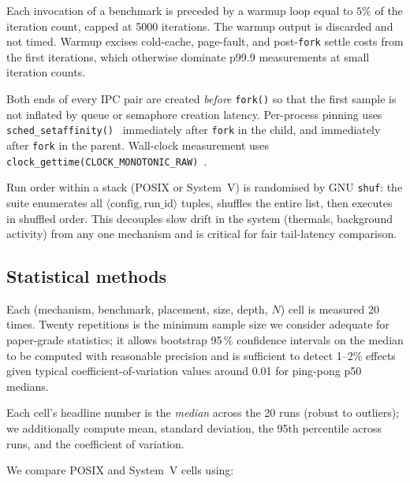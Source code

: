 \documentclass[a4paper,11pt]{article}
\begin{document}
Each invocation of a benchmark is preceded by a warmup loop equal to
$5\%$ of the iteration count, capped at 5000 iterations. The warmup
output is discarded and not timed. Warmup excises cold-cache, page-fault,
and post-\texttt{fork} settle costs from the first iterations, which
otherwise dominate p99.9 measurements at small iteration counts.

Both ends of every IPC pair are created \emph{before}
\texttt{fork()} so that the first sample is not inflated by queue or
semaphore creation latency. Per-process pinning uses
\texttt{sched\_setaffinity()}~\cite{linux_setaffinity} immediately after
\texttt{fork} in the child, and immediately after \texttt{fork} in the
parent. Wall-clock measurement uses \texttt{clock\_gettime(CLOCK\_MONOTONIC\_RAW)}~\cite{linux_clock}.

Run order within a stack (POSIX or System~V) is randomised by GNU
\texttt{shuf}: the suite enumerates all
$\langle\text{config},\text{run\_id}\rangle$ tuples, shuffles the entire
list, then executes in shuffled order. This decouples slow drift in the
system (thermals, background activity) from any one mechanism and is
critical for fair tail-latency comparison.

\subsection{Statistical methods}
\label{sec:method:stats}

Each (mechanism, benchmark, placement, size, depth, $N$) cell is measured
20 times. Twenty repetitions is the minimum sample size we consider
adequate for paper-grade statistics; it allows bootstrap 95\,\% confidence
intervals on the median to be computed with reasonable precision and is
sufficient to detect 1--2\% effects given typical coefficient-of-variation
values around 0.01 for ping-pong p50 medians.

Each cell's headline number is the \emph{median} across the 20 runs
(robust to outliers); we additionally compute mean, standard deviation,
the 95th percentile across runs, and the coefficient of variation.

We compare POSIX and System~V cells using:
\end{document}
